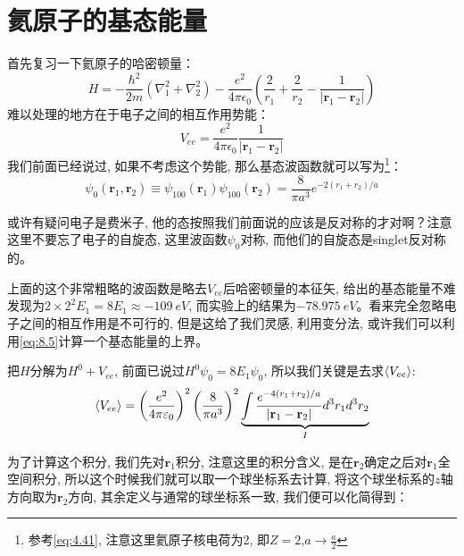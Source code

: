 \documentclass[a4paper,zihao=-4,linespread=1]{ctexrep}
\begin{document}
    \section{氦原子的基态能量}
    首先复习一下氦原子的哈密顿量：
    \begin{equation}
        H=-\frac{\hbar^{2}}{2 m}\left(\nabla_{1}^{2}+\nabla_{2}^{2}\right)-\frac{e^{2}}{4 \pi \epsilon_{0}}\left(\frac{2}{r_{1}}+\frac{2}{r_{2}}-\frac{1}{\left|\mathbf{r}_{1}-\mathbf{r}_{2}\right|}\right)
    \end{equation}
    难以处理的地方在于电子之间的相互作用势能：
    \begin{equation}
        V_{ee}=\frac{e^{2}}{4 \pi \epsilon_{0}} \frac{1}{\left|\mathbf{r}_{1}-\mathbf{r}_{2}\right|}
    \end{equation}
    我们前面已经说过, 如果不考虑这个势能, 那么基态波函数就可以写为\footnote{参考\ref{eq:4.41}, 注意这里氦原子核电荷为2, 即$Z=2$,$a\to\frac{a}{2}$}：
    \begin{equation}
        \label{eq:8.5}
        \psi_{0}\left(\mathbf{r}_{1}, \mathbf{r}_{2}\right) \equiv \psi_{100}\left(\mathbf{r}_{1}\right) \psi_{100}\left(\mathbf{r}_{2}\right)=\frac{8}{\pi a^{3}} e^{-2\left(r_{1}+r_{2}\right) / a}
    \end{equation}
    
    或许有疑问电子是费米子, 他的态按照我们前面说的应该是反对称的才对啊？注意这里不要忘了电子的自旋态, 这里波函数$\psi_0$对称, 而他们的自旋态是singlet反对称的。

    上面的这个非常粗略的波函数是略去$V_{ee}$后哈密顿量的本征矢, 给出的基态能量不难发现为$2\times 2^2 E_1=8E_1\approx\SI{-109}{eV}$, 而实验上的结果为$\SI{-78.975}{eV}$。看来完全忽略电子之间的相互作用是不可行的, 但是这给了我们灵感, 
    利用变分法, 或许我们可以利用\ref{eq:8.5}计算一个基态能量的上界。

    把$H$分解为$H^0+V_{ee}$, 前面已说过$H^0\psi_0=8E_1\psi_0$, 所以我们关键是去求$\braket{V_{ee}}$:
    \begin{equation}
        \label{eq:8.6}
        \braket{V_{ee}}=\left(\frac{e^2}{4\pi\varepsilon_0}\right)^2\left(\frac{8}{\pi a^3}\right)^2\underbrace{\int\frac{e^{-4(r_1+r_2)/a}}{|\mathbf{r}_1-\mathbf{r}_2|}d^3r_1d^3r_2}_{I}
    \end{equation}
    
    为了计算这个积分, 我们先对$\mathbf{r}_1$积分, 注意这里的积分含义, 是在$\mathbf{r}_2$确定之后对$\mathbf{r}_1$全空间积分, 所以这个时候我们就可以取一个球坐标系去计算,
    将这个球坐标系的$z$轴方向取为$\mathbf{r}_2$方向, 其余定义与通常的球坐标系一致, 我们便可以化简得到：
\end{document}
